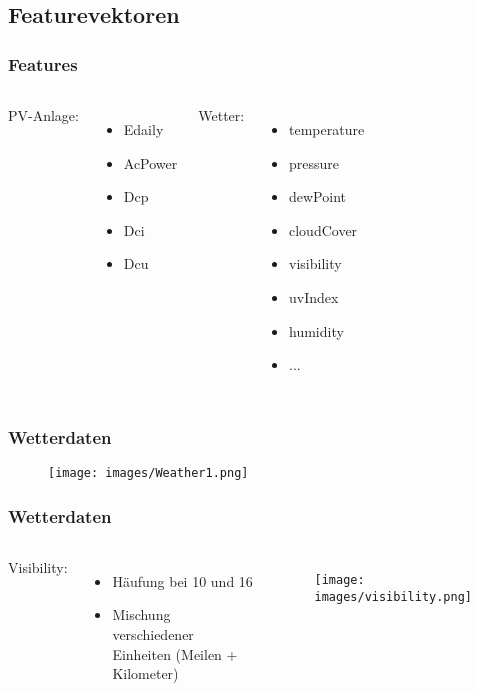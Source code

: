 \documentclass[utf8x, xcolor=dvipsnames]{beamer}
\begin{document}
\subsection{Featurevektoren}

\begin{frame}
\frametitle{Features}
\begin{columns}[t]
	PV-Anlage:
	\begin{itemize}
		\item Edaily
		\item AcPower
		\item Dcp
		\item Dci
		\item Dcu
	\end{itemize}
	Wetter:
	\begin{itemize}
		\item temperature
		\item pressure
		\item dewPoint
		\item cloudCover
		\item visibility
		\item uvIndex
		\item humidity
		\item ...
	\end{itemize}
\end{columns}
\end{frame}

\begin{frame}
\frametitle{Wetterdaten}
\begin{figure}
	\texttt{[image: images/Weather1.png]}
\end{figure}
\end{frame}

\begin{frame}
\frametitle{Wetterdaten}
\begin{columns}[c]
		Visibility:
		\begin{itemize}
			\item Häufung bei 10 und 16\newline
			\item Mischung verschiedener Einheiten (Meilen + Kilometer)
		\end{itemize}
		\begin{figure}
			\texttt{[image: images/visibility.png]}
		\end{figure}
\end{columns}
\end{frame}
\end{document}
